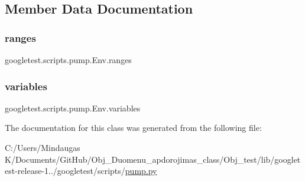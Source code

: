 \subsection{Member Data Documentation}
\mbox{\label{classgoogletest_1_1scripts_1_1pump_1_1_env_aabe0a82292dbf0b1e6619c0f30d11cc3}} 
\subsubsection{\texorpdfstring{ranges}{ranges}}
{\footnotesize\ttfamily googletest.\+scripts.\+pump.\+Env.\+ranges}

\mbox{\label{classgoogletest_1_1scripts_1_1pump_1_1_env_ad7ded662887fcb7e96f0f153f67aa810}} 
\subsubsection{\texorpdfstring{variables}{variables}}
{\footnotesize\ttfamily googletest.\+scripts.\+pump.\+Env.\+variables}



The documentation for this class was generated from the following file\+:\begin{DoxyCompactItemize}
\item 
C\+:/\+Users/\+Mindaugas K/\+Documents/\+Git\+Hub/\+Obj\+\_\+\+Duomenu\+\_\+apdorojimas\+\_\+class/\+Obj\+\_\+test/lib/googletest-\/release-\/1../googletest/scripts/\mbox{\hyperlink{_obj__test_2lib_2googletest-release-1_88_81_2googletest_2scripts_2pump_8py}{pump.\+py}}\end{DoxyCompactItemize}
